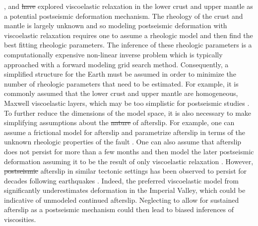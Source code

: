 \documentclass[draft,linenumbers]{AGUJournal}
\providecommand{\DIFadd}[1]{{\protect\color{blue}\uwave{#1}}} %
\providecommand{\DIFdel}[1]{{\protect\color{red}\sout{#1}}}                      %
\providecommand{\DIFaddbegin}{} %
\providecommand{\DIFaddend}{} %
\providecommand{\DIFdelbegin}{} %
\providecommand{\DIFdelend}{} %
\begin{document}
\citet{Pollitz2012}, \citet{Rollins2015} and \citet{Spinler2015} \DIFdelbegin \DIFdel{have }\DIFdelend explored viscoelastic relaxation in the lower crust and upper mantle as a potential postseismic deformation mechanism. The rheology of the crust and mantle is largely unknown and so modeling postseismic deformation with viscoelastic relaxation requires one to assume a rheologic model and then find the best fitting rheologic parameters.  The inference of these rheologic parameters is a computationally expensive non-linear inverse problem which is typically approached with a forward modeling grid search method.  Consequently, a simplified structure for the Earth must be assumed in order to minimize the number of rheologic parameters that need to be estimated.  For example, it is commonly assumed that the lower crust and upper mantle are homogeneous, Maxwell viscoelastic layers, which may be too simplistic for postseismic studies  \citep{Riva2009,Hines2013}. To further reduce the dimensions of the model space, it is also necessary to make simplifying assumptions about the \DIFdelbegin \DIFdel{nature }\DIFdelend \DIFaddbegin \DIFadd{behavior }\DIFaddend of afterslip. For example, one can assume a frictional model for afterslip and parametrize afterslip in terms of the unknown rheologic properties of the fault \citep[e.g.][]{Johnson2009,Johnson2004}. One can also assume that afterslip does not persist for more than a few months and then model the later postseismic deformation assuming it to be the result of only viscoelastic relaxation \citep[e.g.][]{Pollitz2012,Spinler2015}. However, \DIFdelbegin \DIFdel{postseismic }\DIFdelend afterslip in similar tectonic settings has been observed to persist for decades following earthquakes \citep{Cakir2012,Cetin2014}. Indeed, the preferred viscoelastic model from \citet{Pollitz2012} significantly underestimates deformation in the Imperial Valley, which could be indicative of unmodeled continued afterslip.  Neglecting to allow for sustained afterslip as a postseismic mechanism could then lead to biased inferences of viscosities. 
\end{document}
